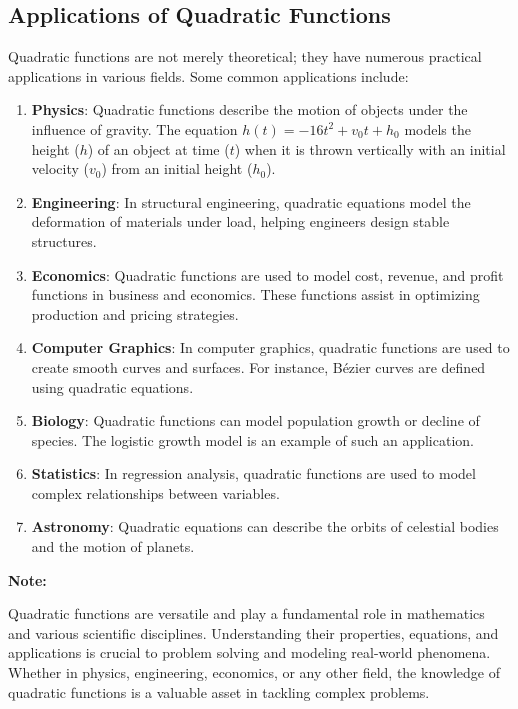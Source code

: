 \documentclass[12pt,a4paper]{article}
\newenvironment{note}
  {\begin{framed}\colorbox{noteboxcolor}{
  \parbox{\dimexpr\linewidth-2\fboxsep}{
  \textbf{Note:}}}}
  {\end{framed}}
\begin{document}
\newpage
\subsection{Applications of Quadratic Functions}

Quadratic functions are not merely theoretical; they have numerous practical applications in various fields. Some common applications include:

\begin{enumerate}
    \item \textbf{Physics}: Quadratic functions describe the motion of objects under the influence of gravity. The equation $h(t) = -16t^2 + v_0t + h_0$ models the height ($h$) of an object at time ($t$) when it is thrown vertically with an initial velocity ($v_0$) from an initial height ($h_0$).

    \item \textbf{Engineering}: In structural engineering, quadratic equations model the deformation of materials under load, helping engineers design stable structures.

    \item \textbf{Economics}: Quadratic functions are used to model cost, revenue, and profit functions in business and economics. These functions assist in optimizing production and pricing strategies.

    \item \textbf{Computer Graphics}: In computer graphics, quadratic functions are used to create smooth curves and surfaces. For instance, Bézier curves are defined using quadratic equations.

    \item \textbf{Biology}: Quadratic functions can model population growth or decline of species. The logistic growth model is an example of such an application.

    \item \textbf{Statistics}: In regression analysis, quadratic functions are used to model complex relationships between variables.

    \item \textbf{Astronomy}: Quadratic equations can describe the orbits of celestial bodies and the motion of planets.

\end{enumerate}
\begin{note}
Quadratic functions are versatile and play a fundamental role in mathematics and various scientific disciplines. Understanding their properties, equations, and applications is crucial to problem solving and modeling real-world phenomena. Whether in physics, engineering, economics, or any other field, the knowledge of quadratic functions is a valuable asset in tackling complex problems.
\end{note}
\end{document}
